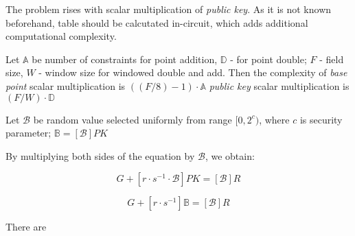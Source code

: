 \documentclass{iacrtrans}
\begin{document}
The problem rises with scalar multiplication of \textit{public key}. As it is not known beforehand, table should be calcutated in-circuit, which 
adds additional computational complexity.


Let $\mathbb{A}$ be number of constraints for point addition, $\mathbb{D}$ - for point double; $F$ - field size, $W$ - window size for windowed double and add. 
Then the complexity of
\textit{base point} scalar multiplication is $((F / 8) - 1) \cdot \mathbb{A}$
\textit{public key} scalar multiplication is $(F / W) \cdot \mathbb{D}$



Let $\mathcal{B}$ be random value selected uniformly from range $[0, 2^c)$, where $c$ is security parameter; 
$\mathbb{B} = [\mathcal{B}] PK$

By multiplying both sides of the equation by $\mathcal{B}$, we obtain:

\begin{equation}
  [m \cdot s^{-1} \cdot \mathcal{B}] G + [r \cdot s^{-1} \cdot \mathcal{B}] PK = [\mathcal{B}]R
\end{equation}

\begin{equation}
  [m \cdot s^{-1} \cdot \mathcal{B}] G + [r \cdot s^{-1}] \mathbb{B} = [\mathcal{B}]R
\end{equation}

There are 



\setcounter{tocdepth}{2}
\end{document}
